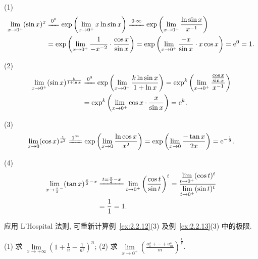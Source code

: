 \begin{solution}
(1)
\[
\begin{aligned}
\lim_{x\to0^{+}}(\sin x)^{x}&\xlongequal{0^{0}}\exp\left(\lim_{x\to0^{+}}x\ln\sin x\right)\xlongequal{0\cdot\infty}\exp\left(\lim_{x\to0^{+}}\frac{\ln\sin x}{x^{-1}}\right)\\
&=\exp\left(\lim_{x\to0^{+}}\frac{1}{-x^{-2}}\cdot\frac{\cos x}{\sin x}\right)=\exp\left(\lim_{x\to0^{+}}\frac{-x}{\sin x}\cdot x\cos x\right)=\mathrm{e}^{0}=1.
\end{aligned}
\]

(2)
\[
\begin{aligned}
\lim_{x\to0^{+}}(\sin x)^{\frac{k}{1+\ln x}}&\xlongequal{0^{0}}\exp\left(\lim_{x\to0^{+}}\frac{k\ln\sin x}{1+\ln x}\right)=\exp^{k}\left(\lim_{x\to0^{+}}\frac{\frac{\cos x}{\sin x}}{x^{-1}}\right)\\
&=\exp^{k}\left(\lim_{x\to0^{+}}\cos x\cdot\frac{x}{\sin x}\right)=\mathrm{e}^{k}.
\end{aligned}
\]

(3)
\[
\lim_{x\to0}(\cos x)^{\frac{1}{x^{2}}}\xlongequal{1^{\infty}}\exp\left(\lim_{x\to0}\frac{\ln\cos x}{x^{2}}\right)=\exp\left(\lim_{x\to0}\frac{-\tan x}{2x}\right)=\mathrm{e}^{-\frac{1}{2}}.
\]

(4)
\[
\begin{aligned}
\lim_{x\to\frac{\pi}{2}^{-}}(\tan x)^{\frac{\pi}{2}-x}&\xlongequal{t=\frac{\pi}{2}-x}\lim_{t\to0^{+}}\left(\frac{\cos t}{\sin t}\right)^{t}=\frac{\lim\limits_{t\to0^{+}}(\cos t)^{t}}{\lim\limits_{t\to0^{+}}(\sin t)^{t}}\\
&=\frac{1}{1}=1.
\end{aligned}
\]
\end{solution}

应用 L'Hospital 法则, 可重新计算例~\ref{ex:2.2.12}(3) 及例~\ref{ex:2.2.13}(3) 中的极限.

\begin{example}\label{ex:3.4.6}
(1) 求 $\lim\limits_{x\to+\infty}\left(1+\frac{1}{n}-\frac{1}{n^{2}}\right)^{n}$;
(2) 求 $\lim\limits_{x\to0^{+}}\left(\frac{a_1^{x}+\cdots+a_m^{x}}{m}\right)^{\frac{1}{x}}$.
\end{example}

